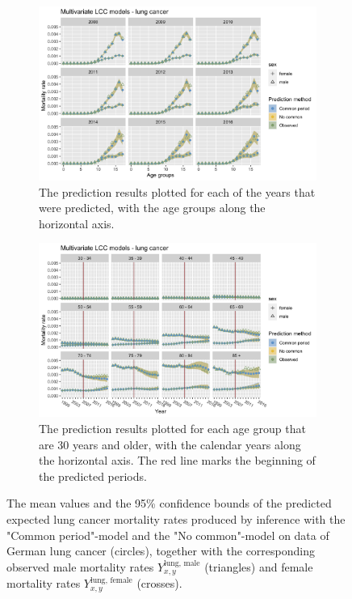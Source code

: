 \begin{figure}[h!]
    \centering
    \begin{subfigure}[b]{.75\linewidth}
        \includegraphics[width=\linewidth]{real-data/real-data-multivariate/Figures/multivariate-LCC-by-age-lung.png}
        \caption{The prediction results plotted for each of the years that were predicted, with the age groups along the horizontal axis.}
        \label{fig:mv-LCC-lung-top}
    \end{subfigure}
    
    \begin{subfigure}[b]{.75\linewidth}
        \includegraphics[width=\linewidth]{real-data/real-data-multivariate/Figures/multivariate-LCC-by-period-lung.png}
        \caption{The prediction results plotted for each age group that are 30 years and older, with the calendar years along the horizontal axis. The red line marks the beginning of the predicted periods.}
        \label{fig:mv-LCC-lung-bottom}
    \end{subfigure}
    
    \caption{The mean values and the 95\% confidence bounds of the predicted expected lung cancer mortality rates produced by inference with the "Common period"-model and the "No common"-model on data of German lung cancer (circles), together with the corresponding observed male mortality rates $Y_{x,y}^{\text{lung, male}}$ (triangles) and female mortality rates $Y_{x,y}^{\text{lung, female}}$ (crosses).}
    \label{fig:mv-LCC-lung}
\end{figure}

